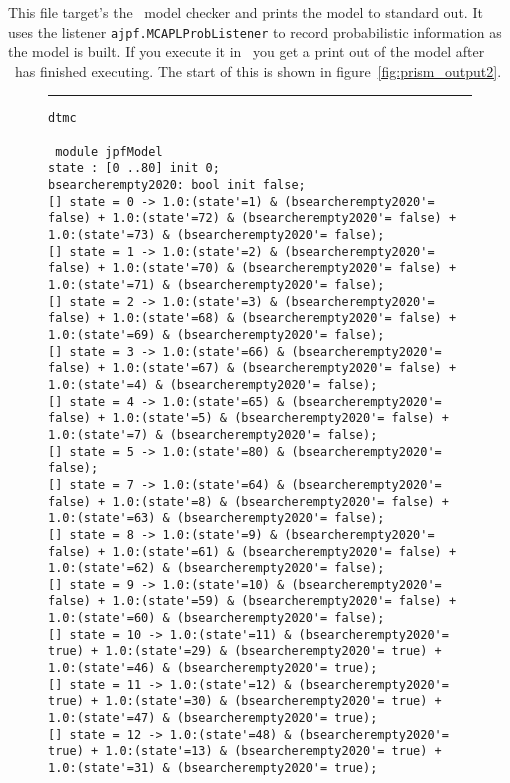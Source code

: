 This file target's the \prism\ model checker and prints the model to standard out.  It uses the listener \texttt{ajpf.MCAPLProbListener} to record probabilistic information as the model is built.  If you execute it in \ajpf\ you get a print out of the model after \ajpf\  has finished executing.  The start of this is shown in figure~\ref{fig:prism_output2}.

\begin{figure}
\noindent\rule{\textwidth}{1pt}
\begin{small}
\begin{verbatim}
dtmc

 module jpfModel
state : [0 ..80] init 0;
bsearcherempty2020: bool init false;
[] state = 0 -> 1.0:(state'=1) & (bsearcherempty2020'= false) + 1.0:(state'=72) & (bsearcherempty2020'= false) + 1.0:(state'=73) & (bsearcherempty2020'= false);
[] state = 1 -> 1.0:(state'=2) & (bsearcherempty2020'= false) + 1.0:(state'=70) & (bsearcherempty2020'= false) + 1.0:(state'=71) & (bsearcherempty2020'= false);
[] state = 2 -> 1.0:(state'=3) & (bsearcherempty2020'= false) + 1.0:(state'=68) & (bsearcherempty2020'= false) + 1.0:(state'=69) & (bsearcherempty2020'= false);
[] state = 3 -> 1.0:(state'=66) & (bsearcherempty2020'= false) + 1.0:(state'=67) & (bsearcherempty2020'= false) + 1.0:(state'=4) & (bsearcherempty2020'= false);
[] state = 4 -> 1.0:(state'=65) & (bsearcherempty2020'= false) + 1.0:(state'=5) & (bsearcherempty2020'= false) + 1.0:(state'=7) & (bsearcherempty2020'= false);
[] state = 5 -> 1.0:(state'=80) & (bsearcherempty2020'= false);
[] state = 7 -> 1.0:(state'=64) & (bsearcherempty2020'= false) + 1.0:(state'=8) & (bsearcherempty2020'= false) + 1.0:(state'=63) & (bsearcherempty2020'= false);
[] state = 8 -> 1.0:(state'=9) & (bsearcherempty2020'= false) + 1.0:(state'=61) & (bsearcherempty2020'= false) + 1.0:(state'=62) & (bsearcherempty2020'= false);
[] state = 9 -> 1.0:(state'=10) & (bsearcherempty2020'= false) + 1.0:(state'=59) & (bsearcherempty2020'= false) + 1.0:(state'=60) & (bsearcherempty2020'= false);
[] state = 10 -> 1.0:(state'=11) & (bsearcherempty2020'= true) + 1.0:(state'=29) & (bsearcherempty2020'= true) + 1.0:(state'=46) & (bsearcherempty2020'= true);
[] state = 11 -> 1.0:(state'=12) & (bsearcherempty2020'= true) + 1.0:(state'=30) & (bsearcherempty2020'= true) + 1.0:(state'=47) & (bsearcherempty2020'= true);
[] state = 12 -> 1.0:(state'=48) & (bsearcherempty2020'= true) + 1.0:(state'=13) & (bsearcherempty2020'= true) + 1.0:(state'=31) & (bsearcherempty2020'= true);

\end{verbatim}
\end{small}
\end{figure}
